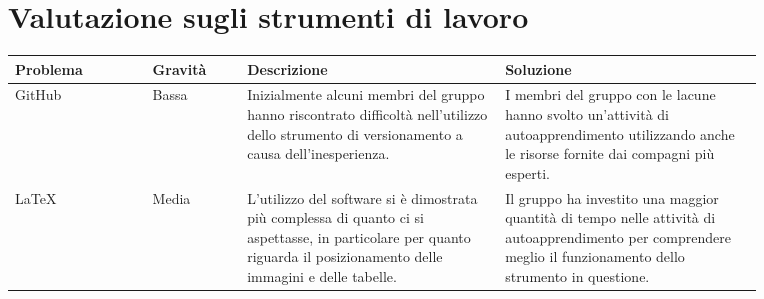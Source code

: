\section{Valutazione sugli strumenti di lavoro}
    \begin{table}[H]
        \centering
        \begin{tabular}{|p{0.16\linewidth}|p{0.11\linewidth}|p{0.3\linewidth}|p{0.3\linewidth}|}
        \hline
        \rowcolor[HTML]{036400}
        {\color[HTML]{FFFFFF} \textbf{Problema}} & {\color[HTML]{FFFFFF} \textbf{Gravità}} & {\color[HTML]{FFFFFF} \textbf{Descrizione}} & {\color[HTML]{FFFFFF} \textbf{Soluzione}} \\ \hline
        \rowcolor[HTML]{EFEFEF}
        GitHub & Bassa & Inizialmente alcuni membri del gruppo hanno riscontrato difficoltà nell'utilizzo dello strumento di versionamento a causa dell'inesperienza. & I membri del gruppo con le lacune hanno svolto un'attività di autoapprendimento utilizzando anche le risorse fornite dai compagni più esperti. \\ \hline
        \rowcolor[HTML]{C0C0C0}
        \LaTeX & Media & L'utilizzo del software si è dimostrata più complessa di quanto ci si aspettasse, in particolare per quanto riguarda il posizionamento delle immagini e delle tabelle. & Il gruppo ha investito una maggior quantità di tempo nelle attività di autoapprendimento per comprendere meglio il funzionamento dello strumento in questione. \\ \hline
        \end{tabular}
    \end{table}
